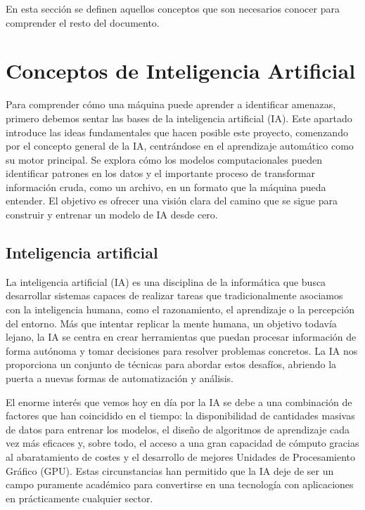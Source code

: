 
En esta sección se definen aquellos conceptos que son necesarios conocer para comprender el resto del documento.

\section{Conceptos de Inteligencia Artificial}

Para comprender cómo una máquina puede aprender a identificar amenazas, primero debemos sentar las bases de la inteligencia artificial (IA). Este apartado introduce las ideas fundamentales que hacen posible este proyecto, comenzando por el concepto general de la IA, centrándose en el aprendizaje automático como su motor principal. Se explora cómo los modelos computacionales pueden identificar patrones en los datos y el importante proceso de transformar información cruda, como un archivo, en un formato que la máquina pueda entender. El objetivo es ofrecer una visión clara del camino que se sigue para construir y entrenar un modelo de IA desde cero.

\subsection{Inteligencia artificial}

La inteligencia artificial (IA) es una disciplina de la informática que busca desarrollar sistemas capaces de realizar tareas que tradicionalmente asociamos con la inteligencia humana, como el razonamiento, el aprendizaje o la percepción del entorno. Más que intentar replicar la mente humana, un objetivo todavía lejano, la IA se centra en crear herramientas que puedan procesar información de forma autónoma y tomar decisiones para resolver problemas concretos. La IA nos proporciona un conjunto de técnicas para abordar estos desafíos, abriendo la puerta a nuevas formas de automatización y análisis.

El enorme interés que vemos hoy en día por la IA se debe a una combinación de factores que han coincidido en el tiempo: la disponibilidad de cantidades masivas de datos para entrenar los modelos, el diseño de algoritmos de aprendizaje cada vez más eficaces y, sobre todo, el acceso a una gran capacidad de cómputo gracias al abaratamiento de costes y el desarrollo de mejores Unidades de Procesamiento Gráfico (GPU). Estas circunstancias han permitido que la IA deje de ser un campo puramente académico para convertirse en una tecnología con aplicaciones en prácticamente cualquier sector.

